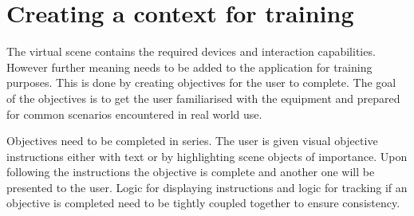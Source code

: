 \documentclass[12pt, a4paper,oneside, nocenter]{thesis}
\begin{document}
\section{Creating a context for training}
The virtual scene contains the required devices and interaction capabilities. However further meaning needs to be added to the application for training purposes. This is done by creating objectives for the user to complete. The goal of the objectives is to get the user familiarised with the equipment and prepared for common scenarios encountered in real world use.
\par
Objectives need to be completed in series. The user is given visual objective instructions either with text or by highlighting scene objects of importance. Upon following the instructions the objective is complete and another one will be presented to the user. Logic for displaying instructions and logic for tracking if an objective is completed need to be tightly coupled together to ensure consistency.
\end{document}

